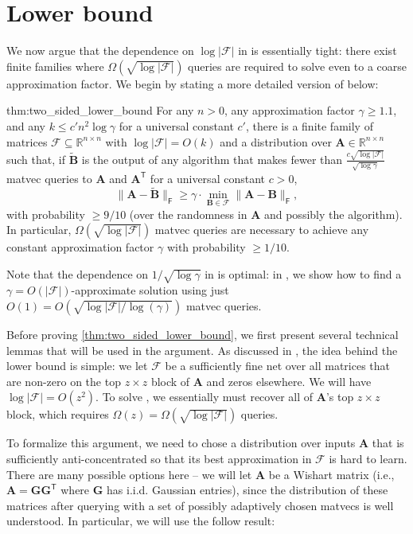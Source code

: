 \documentclass{article}[11pt]
\theoremstyle{definition}
\newcommand{\bv}[1]{\boldsymbol{\mathbf{#1}}}
\newcommand{\R}{\mathbb{R}}
\newcommand{\T}{\mathsf{T}}
\newcommand{\Fro}{\mathsf{F}}
\newcommand{\F}{\mathcal{F}}
\begin{document}
    
\section{Lower bound}
\label{sec:lower_bounds}


We now argue that the dependence on $\log |\mathcal{F}|$ in  is essentially tight: there exist finite families where $\Omega(\sqrt{\log |\mathcal{F}|})$ queries are required to solve  even to a coarse approximation factor. We begin by stating a more detailed version of  below:
\begin{reptheorem}{thm:two_sided_lower_bound}
    For any $n > 0$, any approximation factor $\gamma \ge 1.1$, and any $k \leq c'n^2 \log \gamma$ for a universal constant $c'$, there 
    is a finite family of matrices $\F \subseteq \R^{n\times n}$ with $\log |\F| = O(k)$ and a distribution over  $\bv A \in \R^{n \times n}$ such that, if $\bv{\tilde B}$ is the output of any algorithm that makes fewer than $\frac{c\sqrt{\log|\F|}}{\sqrt{\log \gamma}}$ matvec queries to $\bv A$ and $\bv A^\T$ for a universal constant $c > 0$,
\[ \|\bv A- \bv{\tilde B}\|_\Fro \geq \gamma \cdot \min_{\bv B \in \F} \|\bv A - \bv B\|_\Fro, \]
 with probability $\geq 9/10$ (over the randomness in $\bv A$ and possibly the algorithm).
In particular, $\Omega(\sqrt{\log |\F|})$ matvec queries are necessary to achieve any constant approximation factor $\gamma$ with probability $\ge 1/10$.
\end{reptheorem}
Note that the dependence on $1/\sqrt{\log \gamma}$ in  is optimal: in , we show how to find a $\gamma = O(|\F|)$-approximate solution using just $O(1) = O(\sqrt{\log |\F|/\log(\gamma)})$ matvec queries.

Before proving \cref{thm:two_sided_lower_bound}, we first present several technical lemmas that will be used in the argument. As discussed in , the idea behind the lower bound is simple: we let $\mathcal F$  be a sufficiently fine net over all matrices that are non-zero on the top $z\times z$ block of $\bv{A}$ and zeros elsewhere. We will have $\log |\F| = O(z^2)$. To solve , we essentially must recover all of $\bv A$'s top $z\times z$ block, which requires $\Omega(z) = \Omega(\sqrt{\log|\F|})$ queries. 

To formalize this argument, we need to chose a distribution over inputs $\bv A$ that is sufficiently anti-concentrated so that its best approximation in $\F$ is hard to learn. There are many possible options here -- we will let $\bv A$ be a Wishart matrix (i.e., $\bv A = \bv G \bv G^\T$ where $\bv G$ has i.i.d. Gaussian entries), since the distribution of these matrices after querying with a set of possibly adaptively chosen matvecs is well understood. In particular, we will use the follow result: 
\end{document}

